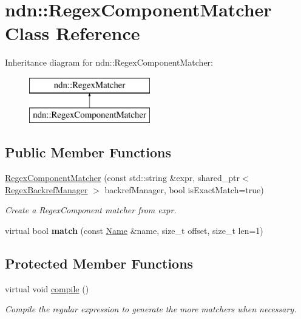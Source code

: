 \hypertarget{classndn_1_1RegexComponentMatcher}{}\section{ndn\+:\+:Regex\+Component\+Matcher Class Reference}
\label{classndn_1_1RegexComponentMatcher}
Inheritance diagram for ndn\+:\+:Regex\+Component\+Matcher\+:\begin{figure}[H]
\begin{center}
\leavevmode
\includegraphics[height=2.000000cm]{classndn_1_1RegexComponentMatcher}
\end{center}
\end{figure}
\subsection*{Public Member Functions}
\begin{DoxyCompactItemize}
\item 
\hyperlink{classndn_1_1RegexComponentMatcher_a6c29029eab0297b5a7423e9e12be180a}{Regex\+Component\+Matcher} (const std\+::string \&expr, shared\+\_\+ptr$<$ \hyperlink{classndn_1_1RegexBackrefManager}{Regex\+Backref\+Manager} $>$ backref\+Manager, bool is\+Exact\+Match=true)
\begin{DoxyCompactList}\small\item\em Create a Regex\+Component matcher from expr. \end{DoxyCompactList}\item 
virtual bool {\bfseries match} (const \hyperlink{classndn_1_1Name}{Name} \&name, size\+\_\+t offset, size\+\_\+t len=1)\hypertarget{classndn_1_1RegexComponentMatcher_aeadd9ee4d1b3a265fe64d228339f0a8f}{}\label{classndn_1_1RegexComponentMatcher_aeadd9ee4d1b3a265fe64d228339f0a8f}

\end{DoxyCompactItemize}
\subsection*{Protected Member Functions}
\begin{DoxyCompactItemize}
\item 
virtual void \hyperlink{classndn_1_1RegexComponentMatcher_a9ff5d56ac03e2373ac6227353e4579ef}{compile} ()
\begin{DoxyCompactList}\small\item\em Compile the regular expression to generate the more matchers when necessary. \end{DoxyCompactList}\end{DoxyCompactItemize}
